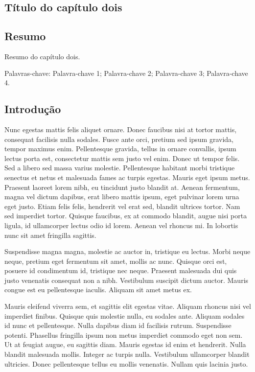 \documentclass[book,A4paper,10pt,twoside,oldfontcommands]{memoir}\usepackage[]{graphicx}\usepackage[usenames,dvipsnames]{color}
\begin{document}
\begin{btUnit}
\chapter{Título do capítulo dois}



\section*{Resumo}

Resumo do capítulo dois. \newline

\noindent Palavras-chave: Palavra-chave 1; Palavra-chave 2;
Palavra-chave 3; Palavra-chave 4.

\section{Introdução}

Nunc egestas mattis felis aliquet ornare. Donec faucibus nisi at
tortor mattis, consequat facilisis nulla sodales. Fusce ante orci,
pretium sed ipsum gravida, tempor maximus enim. Pellentesque gravida,
tellus in ornare convallis, ipsum lectus porta est, consectetur mattis
sem justo vel enim. Donec ut tempor felis. Sed a libero sed massa
varius molestie. Pellentesque habitant morbi tristique senectus et
netus et malesuada fames ac turpis egestas. Mauris eget ipsum metus.
Praesent laoreet lorem nibh, eu tincidunt justo blandit at. Aenean
fermentum, magna vel dictum dapibus, erat libero mattis ipsum, eget
pulvinar lorem urna eget justo. Etiam felis felis, hendrerit vel erat
sed, blandit ultrices tortor. Nam sed imperdiet tortor. Quisque
faucibus, ex at commodo blandit, augue nisi porta ligula, id
ullamcorper lectus odio id lorem. Aenean vel rhoncus mi. In lobortis
nunc sit amet fringilla sagittis.

Suspendisse magna magna, molestie ac auctor in, tristique eu lectus.
Morbi neque neque, pretium eget fermentum sit amet, mollis ac nunc.
Quisque orci est, posuere id condimentum id, tristique nec neque.
Praesent malesuada dui quis justo venenatis consequat non a nibh.
Vestibulum suscipit dictum auctor. Mauris congue est eu pellentesque
iaculis. Aliquam sit amet metus ex.

Mauris eleifend viverra sem, et sagittis elit egestas vitae. Aliquam
rhoncus nisi vel imperdiet finibus. Quisque quis molestie nulla, eu
sodales ante. Aliquam sodales id nunc et pellentesque. Nulla dapibus
diam id facilisis rutrum. Suspendisse potenti. Phasellus fringilla
ipsum non metus imperdiet commodo eget non sem. Ut at feugiat augue,
eu sagittis diam. Mauris egestas id enim et hendrerit. Nulla blandit
malesuada mollis. Integer ac turpis nulla. Vestibulum ullamcorper
blandit ultricies. Donec pellentesque tellus eu mollis venenatis.
Nullam quis lacinia justo.


\end{btUnit}
\end{document}
